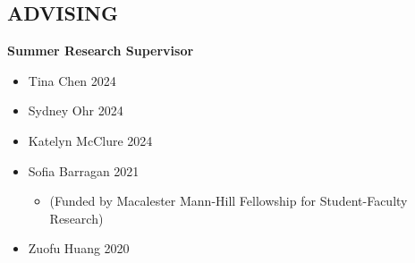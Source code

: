 \documentclass[margin]{res}
\begin{document}
\begin{resume}

\section{ADVISING}	

\textbf{Summer Research Supervisor}
\begin{itemize}
\item Tina Chen \hfill 2024
	
\item Sydney Ohr \hfill 2024 
	
\item Katelyn McClure \hfill 2024 

\item Sofia Barragan \hfill 2021 
	\begin{itemize}[leftmargin=-0in] \vspace{-0.2cm}
	\item[]\begin{footnotesize}(Funded by Macalester Mann-Hill Fellowship for Student-Faculty Research) \end{footnotesize}
	\end{itemize}

\item Zuofu Huang \hfill 2020 
\end{itemize}



\end{resume}
\end{document}
